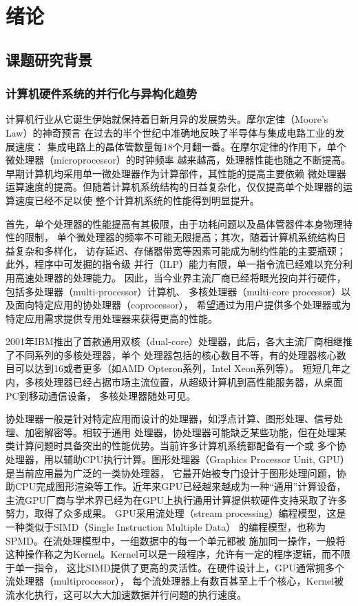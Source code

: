 \chapter{绪论}

\section{课题研究背景}

\subsection{计算机硬件系统的并行化与异构化趋势}
计算机行业从它诞生伊始就保持着日新月异的发展势头。摩尔定律（Moore's Law）的神奇预言
在过去的半个世纪中准确地反映了半导体与集成电路工业的发展速度：
集成电路上的晶体管数量每18个月翻一番。在摩尔定律的作用下，单个微处理器（microprocessor）的时钟频率
越来越高，处理器性能也随之不断提高。早期计算机均采用单一微处理器作为计算部件，其性能的提高主要依赖
微处理器运算速度的提高。但随着计算机系统结构的日益复杂化，仅仅提高单个处理器的运算速度已经不足以使
整个计算机系统的性能得到明显提升。

首先，单个处理器的性能提高有其极限，由于功耗问题以及晶体管器件本身物理特性的限制，
单个微处理器的频率不可能无限提高；其次，随着计算机系统结构日益复杂和多样化，
访存延迟、存储器带宽等因素可能成为制约性能的主要瓶颈；此外，程序中可发掘的指令级
并行（ILP）能力有限，单一指令流已经难以充分利用高速处理器的处理能力。
因此，当今业界主流厂商已经将眼光投向并行硬件，包括多处理器（multi-processor）计算机、
多核处理器（multi-core processor）以及面向特定应用的协处理器（coprocessor），
希望通过为用户提供多个处理器或为特定应用需求提供专用处理器来获得更高的性能。

2001年IBM推出了首款通用双核（dual-core）处理器，此后，各大主流厂商相继推了不同系列的多核处理器，单个
处理器包括的核心数目不等，有的处理器核心数目可以达到16或者更多（如AMD Opteron系列，Intel Xeon系列等）。
短短几年之内，多核处理器已经占据市场主流位置，从超级计算机到高性能服务器，从桌面PC到移动通信设备，
多核处理器随处可见。

协处理器一般是针对特定应用而设计的处理器，如浮点计算、图形处理、信号处理、加密解密等。相较于通用
处理器，协处理器可能缺乏某些功能，但在处理某类计算问题时具备突出的性能优势。当前许多计算机系统都配备有一个或
多个协处理器，用以辅助CPU执行计算。图形处理器（Graphics Processor Unit, GPU）是当前应用最为广泛的一类协处理器，
它最开始被专门设计于图形处理问题，协助CPU完成图形渲染等工作。近年来GPU已经越来越成为一种“通用”计算设备，
主流GPU厂商与学术界已经为在GPU上执行通用计算提供软硬件支持采取了许多努力，取得了众多成果。
GPU采用流处理（stream processing）编程模型，这是一种类似于SIMD（Single Instruction Multiple Data）
的编程模型，也称为SPMD。在流处理模型中，一组数据中的每一个单元都被
施加同一操作，一般将这种操作称之为Kernel。Kernel可以是一段程序，允许有一定的程序逻辑，而不限于单一指令，
这比SIMD提供了更高的灵活性。在硬件设计上，GPU通常拥多个流处理器（multiprocessor），
每个流处理器上有数百甚至上千个核心，Kernel被流水化执行，这可以大大加速数据并行问题的执行速度。

